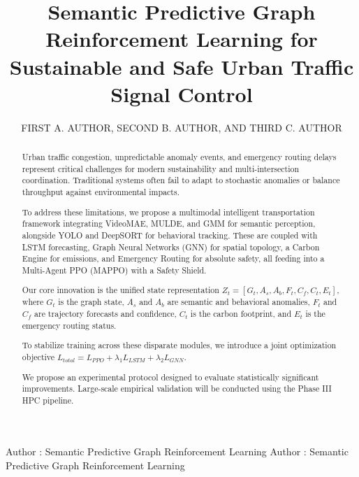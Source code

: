 \documentclass{ieeeaccess}
\begin{document}

\title{Semantic Predictive Graph Reinforcement Learning for Sustainable and Safe Urban Traffic Signal Control}
\author{\uppercase{First A. Author},
\uppercase{Second B. Author, and Third C. Author}}
\address[1]{Department of Computer Science, University of Technology, City, Country}

\markboth
{Author \headeretal: Semantic Predictive Graph Reinforcement Learning}
{Author \headeretal: Semantic Predictive Graph Reinforcement Learning}


\begin{abstract}
Urban traffic congestion, unpredictable anomaly events, and emergency routing delays represent critical challenges for modern sustainability and multi-intersection coordination. Traditional systems often fail to adapt to stochastic anomalies or balance throughput against environmental impacts.

To address these limitations, we propose a multimodal intelligent transportation framework integrating VideoMAE, MULDE, and GMM for semantic perception, alongside YOLO and DeepSORT for behavioral tracking. These are coupled with LSTM forecasting, Graph Neural Networks (GNN) for spatial topology, a Carbon Engine for emissions, and Emergency Routing for absolute safety, all feeding into a Multi-Agent PPO (MAPPO) with a Safety Shield.

Our core innovation is the unified state representation $Z_t = [G_t, A_s, A_b, F_t, C_f, C_t, E_t]$, where $G_t$ is the graph state, $A_s$ and $A_b$ are semantic and behavioral anomalies, $F_t$ and $C_f$ are trajectory forecasts and confidence, $C_t$ is the carbon footprint, and $E_t$ is the emergency routing status.

To stabilize training across these disparate modules, we introduce a joint optimization objective $L_{total} = L_{PPO} + \lambda_1 L_{LSTM} + \lambda_2 L_{GNN}$.

We propose an experimental protocol designed to evaluate statistically significant improvements. Large-scale empirical validation will be conducted using the Phase III HPC pipeline.
\end{abstract}
\end{document}
